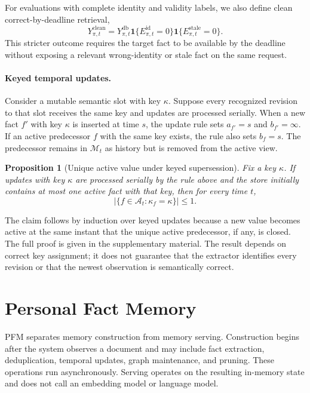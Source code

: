 \documentclass[letterpaper]{article} %
\newtheorem{proposition}{Proposition}
\begin{document}
For evaluations with complete identity and validity labels, we also define clean correct-by-deadline retrieval,
\begin{equation}
Y^{\mathrm{clean}}_{\pi,t}=Y^{\mathrm{db}}_{\pi,t}\mathbf{1}\{E^{\mathrm{id}}_{\pi,t}=0\}\mathbf{1}\{E^{\mathrm{stale}}_{\pi,t}=0\}.
\label{eq:clean_deadline}
\end{equation}
This stricter outcome requires the target fact to be available by the deadline without exposing a relevant wrong-identity or stale fact on the same request.

\paragraph{Keyed temporal updates.} Consider a mutable semantic slot with key $\kappa$. Suppose every recognized revision to that slot receives the same key and updates are processed serially. When a new fact $f'$ with key $\kappa$ is inserted at time $s$, the update rule sets $a_{f'}=s$ and $b_{f'}=\infty$. If an active predecessor $f$ with the same key exists, the rule also sets $b_f=s$. The predecessor remains in $\mathcal{M}_t$ as history but is removed from the active view.

\begin{proposition}[Unique active value under keyed supersession]
\label{prop:unique_active_value}
Fix a key $\kappa$. If updates with key $\kappa$ are processed serially by the rule above and the store initially contains at most one active fact with that key, then for every time $t$,
\begin{equation}
\left|\{f\in\mathcal{A}_t:\kappa_f=\kappa\}\right|\le 1.
\end{equation}
\end{proposition}

The claim follows by induction over keyed updates because a new value becomes active at the same instant that the unique active predecessor, if any, is closed. The full proof is given in the supplementary material. The result depends on correct key assignment; it does not guarantee that the extractor identifies every revision or that the newest observation is semantically correct.

\section{Personal Fact Memory}

PFM separates memory construction from memory serving. Construction begins after the system observes a document and may include fact extraction, deduplication, temporal updates, graph maintenance, and pruning. These operations run asynchronously. Serving operates on the resulting in-memory state and does not call an embedding model or language model.
\end{document}
